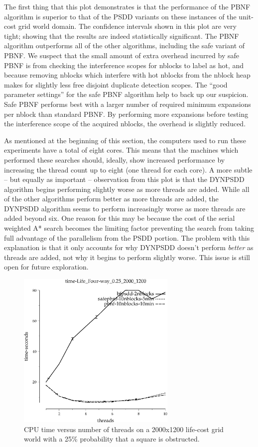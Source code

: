 \documentclass{article}
\begin{document}
The first thing that this plot demonstrates is that the performance of
the PBNF algorithm is superior to that of the PSDD variants on these
instances of the unit-cost grid world domain.  The confidence
intervals shown in this plot are very tight; showing that the results
are indeed statistically significant.  The PBNF algorithm outperforms
all of the other algorithms, including the safe variant of PBNF.  We
suspect that the small amount of extra overhead incurred by safe PBNF
is from checking the interference scopes for nblocks to label as hot,
and because removing nblocks which interfere with hot nblocks from the
nblock heap makes for slightly less free disjoint duplicate detection
scopes.  The ``good parameter settings'' for the safe PBNF algorithm
help to back up our suspicion.  Safe PBNF performs best with a larger
number of required minimum expansions per nblock than standard PBNF.
By performing more expansions before testing the interference scope of
the acquired nblocks, the overhead is slightly reduced.

As mentioned at the beginning of this section, the computers used to
run these experiments have a total of eight cores.  This means that
the machines which performed these searches should, ideally, show
increased performance by increasing the thread count up to eight (one
thread for each core).  A more subtle -- but equally as important --
observation from this plot is that the DYNPSDD algorithm begins
performing slightly worse as more threads are added.  While all of the
other algorithms perform better as more threads are added, the DYNPSDD
algorithm seems to perform increasingly worse as more threads are
added beyond six.  One reason for this may be because the cost of the
serial weighted A* search becomes the limiting factor preventing the
search from taking full advantage of the parallelism from the PSDD
portion.  The problem with this explanation is that it only accounts
for why DYNPSDD doesn't perform \emph{better} as threads are added,
not why it begins to perform slightly worse.  This issue is still open
for future exploration.

\begin{figure}[t]
\includegraphics[width=3in]{../graphs/grid_life_four-way_0.25_2000_1200/time-Life_Four-way_0.25_2000_1200.eps}
\caption{CPU time versus number of threads on a 2000x1200 life-cost
  grid world with a 25\% probability that a square is obstructed.}
\label{fig:grid-life}
\end{figure}
\end{document}
